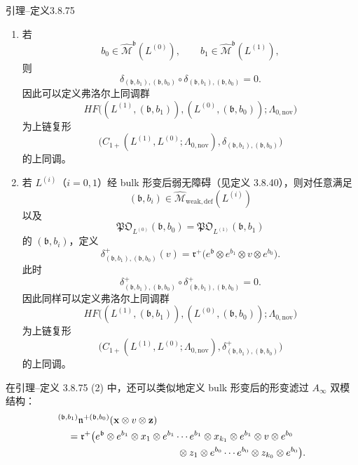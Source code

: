 \begin{statement}{引理--定义}{3.8.75}\label{lem-def:3-8-75}
\begin{enumerate}[label=\textup{(\arabic*)},leftmargin=2.8em]
\item 若
\[
 b_0\in\widehat{\mathcal M}^{\mathfrak b}(L^{(0)}),
 \qquad
 b_1\in\widehat{\mathcal M}^{\mathfrak b}(L^{(1)}),
\]
则
\[
 \delta_{(\mathfrak b,b_1),(\mathfrak b,b_0)}
 \circ
 \delta_{(\mathfrak b,b_1),(\mathfrak b,b_0)}
 =0.
\]
因此可以定义弗洛尔上同调群
\[
 HF\bigl(
 (L^{(1)},(\mathfrak b,b_1)),
 (L^{(0)},(\mathfrak b,b_0));
 \Lambda_{0,\mathrm{nov}}
 \bigr)
\]
为上链复形
\[
 \bigl(
 C_{1+}(L^{(1)},L^{(0)};\Lambda_{0,\mathrm{nov}}),
 \delta_{(\mathfrak b,b_1),(\mathfrak b,b_0)}
 \bigr)
\]
的上同调。

\item 若 $L^{(i)}$（$i=0,1$）经 bulk 形变后弱无障碍（见定义
3.8.40），则对任意满足
\[
 (\mathfrak b,b_i)
 \in\widehat{\mathcal M}_{\mathrm{weak,def}}(L^{(i)})
\]
以及
\[
 \mathfrak{PO}_{L^{(0)}}(\mathfrak b,b_0)
 =
 \mathfrak{PO}_{L^{(1)}}(\mathfrak b,b_1)
\]
的 $(\mathfrak b,b_i)$，定义
\[
 \delta^+_{(\mathfrak b,b_1),(\mathfrak b,b_0)}(v)
 =
 \mathfrak r^+\bigl(
 e^{\mathfrak b}\otimes e^{b_1}\otimes v\otimes e^{b_0}
 \bigr).
\]
此时
\[
 \delta^+_{(\mathfrak b,b_1),(\mathfrak b,b_0)}
 \circ
 \delta^+_{(\mathfrak b,b_1),(\mathfrak b,b_0)}
 =0.
\]
因此同样可以定义弗洛尔上同调群
\[
 HF\bigl(
 (L^{(1)},(\mathfrak b,b_1)),
 (L^{(0)},(\mathfrak b,b_0));
 \Lambda_{0,\mathrm{nov}}
 \bigr)
\]
为上链复形
\[
 \bigl(
 C_{1+}(L^{(1)},L^{(0)};\Lambda_{0,\mathrm{nov}}),
 \delta^+_{(\mathfrak b,b_1),(\mathfrak b,b_0)}
 \bigr)
\]
的上同调。
\end{enumerate}
\end{statement}

在引理--定义 3.8.75 (2) 中，还可以类似地定义 bulk 形变后的形变滤过
$A_\infty$ 双模结构：
\[
\begin{aligned}
&{}^{(\mathfrak b,b_1)}
\mathfrak n^{+(\mathfrak b,b_0)}
(\mathbf x\otimes v\otimes\mathbf z)\\
&\quad=
\mathfrak r^+\bigl(
e^{\mathfrak b}\otimes
e^{b_1}\otimes x_1\otimes e^{b_1}\cdots
e^{b_1}\otimes x_{k_1}\otimes e^{b_1}
\otimes v\otimes e^{b_0}\\
&\hspace{43mm}{}
\otimes z_1\otimes e^{b_0}\cdots
e^{b_0}\otimes z_{k_0}\otimes e^{b_0}
\bigr).
\end{aligned}
\]

